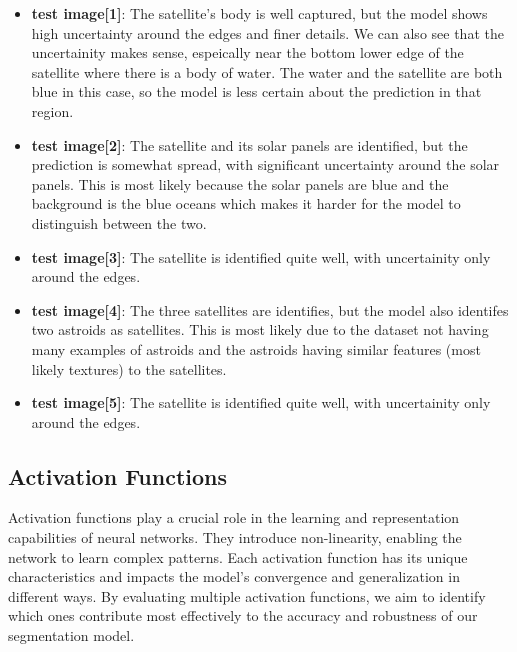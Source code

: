 \documentclass{article}
\begin{document}
\begin{itemize}
    \item \textbf{test image[1]}: The satellite's body is well captured, but the model shows high uncertainty around the 
    edges and finer details. We can also see that the uncertainity makes sense, espeically near the bottom lower edge of 
    the satellite where there is a body of water. The water and the satellite are both blue in this case, so the model is 
    less certain about the prediction in that region.
    \item \textbf{test image[2]}: The satellite and its solar panels are identified, but the prediction is somewhat 
    spread, with significant uncertainty around the solar panels. This is most likely because the solar panels are blue 
    and the background is the blue oceans which makes it harder for the model to distinguish between the two.
    \item \textbf{test image[3]}: The satellite is identified quite well, with uncertainity only around the edges.
    \item \textbf{test image[4]}: The three satellites are identifies, but the model also identifes two astroids as satellites. 
    This is most likely due to the dataset not having many examples of astroids and the astroids having similar features 
    (most likely textures) to the satellites.
    \item \textbf{test image[5]}: The satellite is identified quite well, with uncertainity only around the edges.
\end{itemize}
\vspace{1em}

\subsection{Activation Functions}

Activation functions play a crucial role in the learning and representation capabilities of neural networks. They introduce 
non-linearity, enabling the network to learn complex patterns. Each activation function has its unique characteristics and 
impacts the model's convergence and generalization in different ways. By evaluating multiple activation functions, we aim 
to identify which ones contribute most effectively to the accuracy and robustness of our segmentation model.
\end{document}

